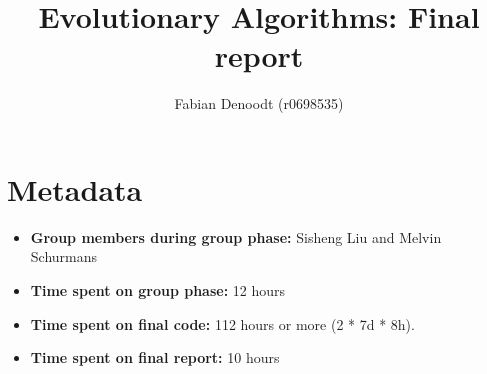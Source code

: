 \documentclass[a4paper,10pt]{article}
\title{Evolutionary Algorithms: Final report}
\author{Fabian Denoodt (r0698535)}
\def\retake{0}
\newcommand{\switch}[2]{\ifnum\retake=0{#1}\else{#2}\fi}
\newcommand{\thisyear}{\the\year}
\newcommand{\deadlineCode}{\switch{December 31, \thisyear{} at 18:00 CET}{August 14, \thisyear{} at 18:00 CET}}
\newcommand{\deadlineReport}{\deadlineCode}
\newcommand{\ReplaceMe}[1]{{\color{blue}#1}}
\newcommand{\RemoveMe}[1]{{\color{purple}#1}}
\begin{document}
\selectfont{}

\maketitle

%
%
%
%
%
%

\section{Metadata}

\begin{itemize}
 \item \textbf{Group members during group phase:} Sisheng Liu and Melvin Schurmans
 \item \textbf{Time spent on group phase:} 12 hours
 \item \textbf{Time spent on final code:} 112 hours or more (2 * 7d * 8h).
 \item \textbf{Time spent on final report:} \ReplaceMe{10 hours}
\end{itemize}
\end{document}
